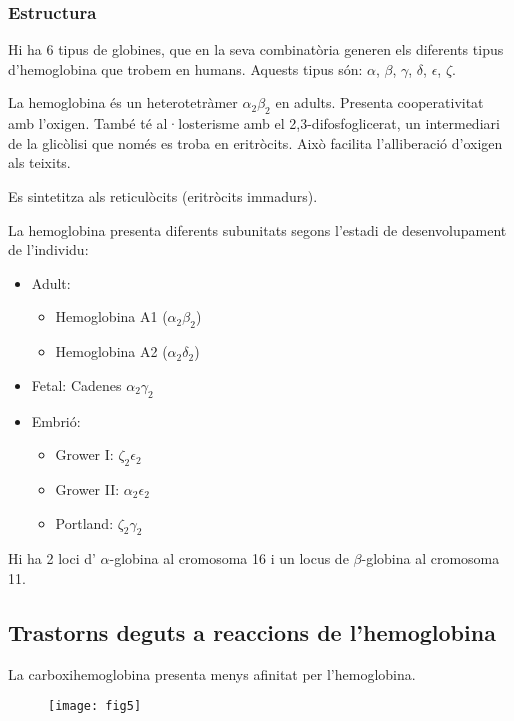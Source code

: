 \subsubsection{Estructura}
Hi ha 6 tipus de globines, que en la seva combinatòria generen els
diferents tipus d'hemoglobina que trobem en humans. Aquests tipus són:
$\alpha$, $\beta$, $\gamma$, $\delta$, $\epsilon$, $\zeta$.

La hemoglobina és un heterotetràmer $\alpha_2\beta_2$ en adults. Presenta
cooperativitat amb l'oxigen. També té al·losterisme amb el
2,3-difosfoglicerat, un intermediari de la glicòlisi que només es
troba en eritròcits. Això facilita l'alliberació d'oxigen als
teixits.

Es sintetitza als reticulòcits (eritròcits immadurs).

La hemoglobina presenta diferents subunitats segons l'estadi de
desenvolupament de l'individu:
\begin{itemize}
\item Adult:
  \begin{itemize}
  \item Hemoglobina A1 ($\alpha_2\beta_2$)
  \item Hemoglobina A2 ($\alpha_2\delta_2$)
  \end{itemize}

\item Fetal: Cadenes $\alpha_2\gamma_2$

\item Embrió:
  \begin{itemize}
  \item Grower I: $\zeta_2\epsilon_2$
  \item Grower II: $\alpha_2\epsilon_2$
  \item Portland: $\zeta_2\gamma_2$
  \end{itemize}
\end{itemize}

Hi ha 2 loci d' $\alpha$-globina al cromosoma 16 i un locus de $\beta$-globina
al cromosoma 11.

\subsection{Trastorns deguts a reaccions de l'hemoglobina}
La carboxihemoglobina presenta menys afinitat per l'hemoglobina.

\begin{figure}[H]
  \centering
  \texttt{[image: fig5]}
\end{figure}

